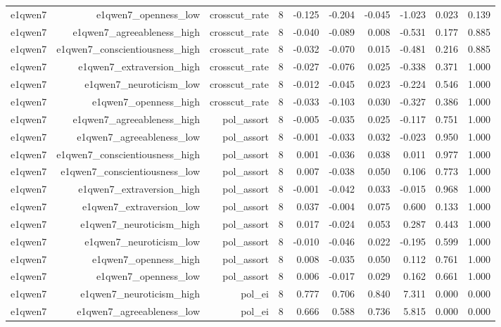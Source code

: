 \documentclass[11pt]{article}
\begin{document}
\begin{landscape}
\begin{longtable}{@{}lrrrrrrrrr@{}}
e1qwen7 & e1qwen7\_openness\_low & crosscut\_rate & 8 & -0.125 & -0.204 & -0.045 & -1.023 & 0.023 & 0.139 \\
e1qwen7 & e1qwen7\_agreeableness\_high & crosscut\_rate & 8 & -0.040 & -0.089 & 0.008 & -0.531 & 0.177 & 0.885 \\
e1qwen7 & e1qwen7\_conscientiousness\_high & crosscut\_rate & 8 & -0.032 & -0.070 & 0.015 & -0.481 & 0.216 & 0.885 \\
e1qwen7 & e1qwen7\_extraversion\_high & crosscut\_rate & 8 & -0.027 & -0.076 & 0.025 & -0.338 & 0.371 & 1.000 \\
e1qwen7 & e1qwen7\_neuroticism\_low & crosscut\_rate & 8 & -0.012 & -0.045 & 0.023 & -0.224 & 0.546 & 1.000 \\
e1qwen7 & e1qwen7\_openness\_high & crosscut\_rate & 8 & -0.033 & -0.103 & 0.030 & -0.327 & 0.386 & 1.000 \\
e1qwen7 & e1qwen7\_agreeableness\_high & pol\_assort & 8 & -0.005 & -0.035 & 0.025 & -0.117 & 0.751 & 1.000 \\
e1qwen7 & e1qwen7\_agreeableness\_low & pol\_assort & 8 & -0.001 & -0.033 & 0.032 & -0.023 & 0.950 & 1.000 \\
e1qwen7 & e1qwen7\_conscientiousness\_high & pol\_assort & 8 & 0.001 & -0.036 & 0.038 & 0.011 & 0.977 & 1.000 \\
e1qwen7 & e1qwen7\_conscientiousness\_low & pol\_assort & 8 & 0.007 & -0.038 & 0.050 & 0.106 & 0.773 & 1.000 \\
e1qwen7 & e1qwen7\_extraversion\_high & pol\_assort & 8 & -0.001 & -0.042 & 0.033 & -0.015 & 0.968 & 1.000 \\
e1qwen7 & e1qwen7\_extraversion\_low & pol\_assort & 8 & 0.037 & -0.004 & 0.075 & 0.600 & 0.133 & 1.000 \\
e1qwen7 & e1qwen7\_neuroticism\_high & pol\_assort & 8 & 0.017 & -0.024 & 0.053 & 0.287 & 0.443 & 1.000 \\
e1qwen7 & e1qwen7\_neuroticism\_low & pol\_assort & 8 & -0.010 & -0.046 & 0.022 & -0.195 & 0.599 & 1.000 \\
e1qwen7 & e1qwen7\_openness\_high & pol\_assort & 8 & 0.008 & -0.035 & 0.050 & 0.112 & 0.761 & 1.000 \\
e1qwen7 & e1qwen7\_openness\_low & pol\_assort & 8 & 0.006 & -0.017 & 0.029 & 0.162 & 0.661 & 1.000 \\
e1qwen7 & e1qwen7\_neuroticism\_high & pol\_ei & 8 & 0.777 & 0.706 & 0.840 & 7.311 & 0.000 & 0.000 \\
e1qwen7 & e1qwen7\_agreeableness\_low & pol\_ei & 8 & 0.666 & 0.588 & 0.736 & 5.815 & 0.000 & 0.000 \\

\end{longtable}
\end{landscape}
\end{document}
